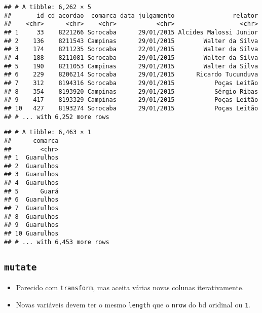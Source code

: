 \documentclass[]{book}
\newenvironment{Shaded}{\begin{snugshade}}{\end{snugshade}}
\newcommand{\KeywordTok}[1]{\textcolor[rgb]{0.13,0.29,0.53}{\textbf{{#1}}}}
\newcommand{\StringTok}[1]{\textcolor[rgb]{0.31,0.60,0.02}{{#1}}}
\newcommand{\NormalTok}[1]{{#1}}
\providecommand{\tightlist}{%
  \setlength{\itemsep}{0pt}\setlength{\parskip}{0pt}}
\begin{document}
\begin{verbatim}
## # A tibble: 6,262 × 5
##       id cd_acordao  comarca data_julgamento                relator
##    <chr>      <chr>    <chr>           <chr>                  <chr>
## 1     33    8221266 Sorocaba      29/01/2015 Alcides Malossi Junior
## 2    136    8211543 Campinas      29/01/2015        Walter da Silva
## 3    174    8211235 Sorocaba      22/01/2015        Walter da Silva
## 4    188    8211081 Sorocaba      29/01/2015        Walter da Silva
## 5    190    8211053 Campinas      29/01/2015        Walter da Silva
## 6    229    8206214 Sorocaba      29/01/2015      Ricardo Tucunduva
## 7    312    8194316 Sorocaba      29/01/2015           Poças Leitão
## 8    354    8193920 Campinas      29/01/2015           Sérgio Ribas
## 9    417    8193329 Campinas      29/01/2015           Poças Leitão
## 10   427    8193274 Sorocaba      29/01/2015           Poças Leitão
## # ... with 6,252 more rows
\end{verbatim}

\begin{Shaded}
\end{Shaded}

\begin{verbatim}
## # A tibble: 6,463 × 1
##      comarca
##        <chr>
## 1  Guarulhos
## 2  Guarulhos
## 3  Guarulhos
## 4  Guarulhos
## 5      Guará
## 6  Guarulhos
## 7  Guarulhos
## 8  Guarulhos
## 9  Guarulhos
## 10 Guarulhos
## # ... with 6,453 more rows
\end{verbatim}

\subsection{\texorpdfstring{\texttt{mutate}}{mutate}}\label{mutate}

\begin{itemize}
\tightlist
\item
  Parecido com \texttt{transform}, mas aceita várias novas colunas
  iterativamente.
\item
  Novas variáveis devem ter o mesmo \texttt{length} que o \texttt{nrow}
  do bd oridinal ou \texttt{1}.
\end{itemize}
\end{document}
